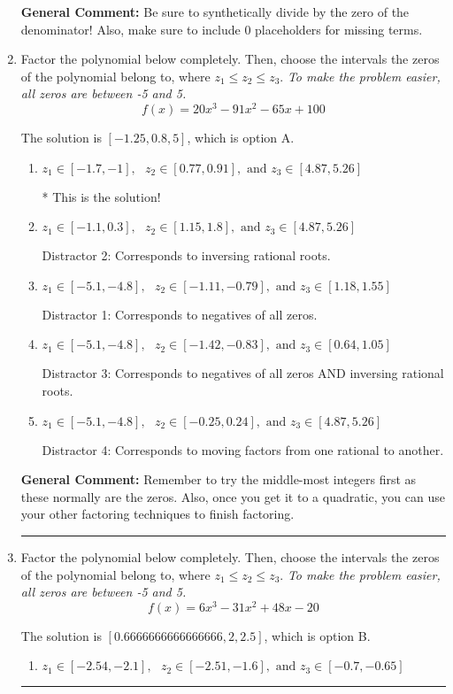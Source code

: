 \documentclass{extbook}[14pt]
\newcommand{\litem}[1]{\item #1

\rule{\textwidth}{0.4pt}}
\begin{document}
\begin{enumerate}
{\textbf{General Comment:} Be sure to synthetically divide by the zero of the denominator! Also, make sure to include 0 placeholders for missing terms.
}
\litem{
Factor the polynomial below completely. Then, choose the intervals the zeros of the polynomial belong to, where $z_1 \leq z_2 \leq z_3$. \textit{To make the problem easier, all zeros are between -5 and 5.}
\[ f(x) = 20x^{3} -91 x^{2} -65 x + 100 \]

The solution is \( [-1.25, 0.8, 5] \), which is option A.\begin{enumerate}[label=\Alph*.]
\item \( z_1 \in [-1.7, -1], \text{   }  z_2 \in [0.77, 0.91], \text{   and   } z_3 \in [4.87, 5.26] \)

* This is the solution!
\item \( z_1 \in [-1.1, 0.3], \text{   }  z_2 \in [1.15, 1.8], \text{   and   } z_3 \in [4.87, 5.26] \)

 Distractor 2: Corresponds to inversing rational roots.
\item \( z_1 \in [-5.1, -4.8], \text{   }  z_2 \in [-1.11, -0.79], \text{   and   } z_3 \in [1.18, 1.55] \)

 Distractor 1: Corresponds to negatives of all zeros.
\item \( z_1 \in [-5.1, -4.8], \text{   }  z_2 \in [-1.42, -0.83], \text{   and   } z_3 \in [0.64, 1.05] \)

 Distractor 3: Corresponds to negatives of all zeros AND inversing rational roots.
\item \( z_1 \in [-5.1, -4.8], \text{   }  z_2 \in [-0.25, 0.24], \text{   and   } z_3 \in [4.87, 5.26] \)

 Distractor 4: Corresponds to moving factors from one rational to another.
\end{enumerate}

\textbf{General Comment:} Remember to try the middle-most integers first as these normally are the zeros. Also, once you get it to a quadratic, you can use your other factoring techniques to finish factoring.
}
\litem{
Factor the polynomial below completely. Then, choose the intervals the zeros of the polynomial belong to, where $z_1 \leq z_2 \leq z_3$. \textit{To make the problem easier, all zeros are between -5 and 5.}
\[ f(x) = 6x^{3} -31 x^{2} +48 x -20 \]

The solution is \( [0.6666666666666666, 2, 2.5] \), which is option B.\begin{enumerate}[label=\Alph*.]
\item \( z_1 \in [-2.54, -2.1], \text{   }  z_2 \in [-2.51, -1.6], \text{   and   } z_3 \in [-0.7, -0.65] \)


\end{enumerate}}
\end{enumerate}
\end{document}
